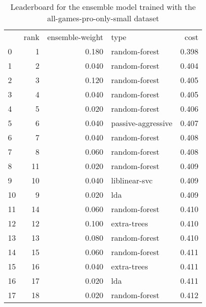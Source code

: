 \begin{table}[]
	\centering
	\begin{tabular}{lrrlr}
		   & rank & ensemble-weight & type               & cost  \\
		0  & 1    & 0.180           & random-forest      & 0.398 \\
		1  & 2    & 0.040           & random-forest      & 0.404 \\
		2  & 3    & 0.120           & random-forest      & 0.405 \\
		3  & 4    & 0.040           & random-forest      & 0.405 \\
		4  & 5    & 0.020           & random-forest      & 0.406 \\
		5  & 6    & 0.040           & passive-aggressive & 0.407 \\
		6  & 7    & 0.040           & random-forest      & 0.408 \\
		7  & 8    & 0.060           & random-forest      & 0.408 \\
		8  & 11   & 0.020           & random-forest      & 0.409 \\
		9  & 10   & 0.040           & liblinear-svc      & 0.409 \\
		10 & 9    & 0.020           & lda                & 0.409 \\
		11 & 14   & 0.060           & random-forest      & 0.410 \\
		12 & 12   & 0.100           & extra-trees        & 0.410 \\
		13 & 13   & 0.080           & random-forest      & 0.410 \\
		14 & 15   & 0.060           & random-forest      & 0.411 \\
		15 & 16   & 0.040           & extra-trees        & 0.411 \\
		16 & 17   & 0.020           & lda                & 0.411 \\
		17 & 18   & 0.020           & random-forest      & 0.412 \\
	\end{tabular}

	\caption{Leaderboard for the ensemble model trained with the all-games-pro-only-small dataset}
	\label{tab:lb-all-games-pro-only-small-randsplit}
\end{table}

